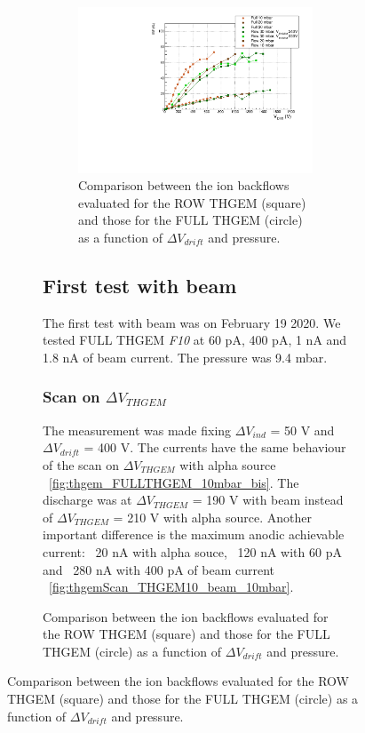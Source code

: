 \documentclass[a4paper, 11 pt]{article}
\newcommand{\Vind}{$\Delta V_{ind}$}
\newcommand{\Vthgem}{$\Delta V_{THGEM}$}
\newcommand{\Vdrift}{$ \Delta V_{drift}$}
\begin{document}
\begin{figure}[htbp]
\begin{figure}[htbp]
\begin{figure}[htbp]
	\centering
	\includegraphics[width=\textwidth]{Immagini/IBFvsDrift_FULLandROW.pdf}
	\caption{Comparison between the ion backflows evaluated for the ROW THGEM (square) and those for the FULL THGEM (circle) as a function of \Vdrift{} and pressure.}
	\label{fig:ion_backflow_FULLandROW}
\end{figure}







\clearpage


\subsection{First test with beam}

The first test with beam was on February 19 2020. We tested FULL THGEM \textit{F10} at 60 pA, 400 pA, 1 nA and 1.8 nA of beam current. The pressure was 9.4 mbar.

\subsubsection{Scan on \Vthgem}

The measurement was made fixing \Vind{} = 50 V and \Vdrift{} = 400 V. The currents have the same behaviour of the scan on \Vthgem{} with alpha source ~\ref{fig:thgem_FULLTHGEM_10mbar_bis}. The discharge was at \Vthgem{} = 190 V with beam instead of \Vthgem{} = 210 V with alpha source. Another important difference is the maximum anodic achievable current: ~20 nA with alpha souce, ~120 nA with 60 pA and ~280 nA with 400 pA of beam current ~\ref{fig:thgemScan_THGEM10_beam_10mbar}.


\end{figure}
\end{figure}
\end{document}
